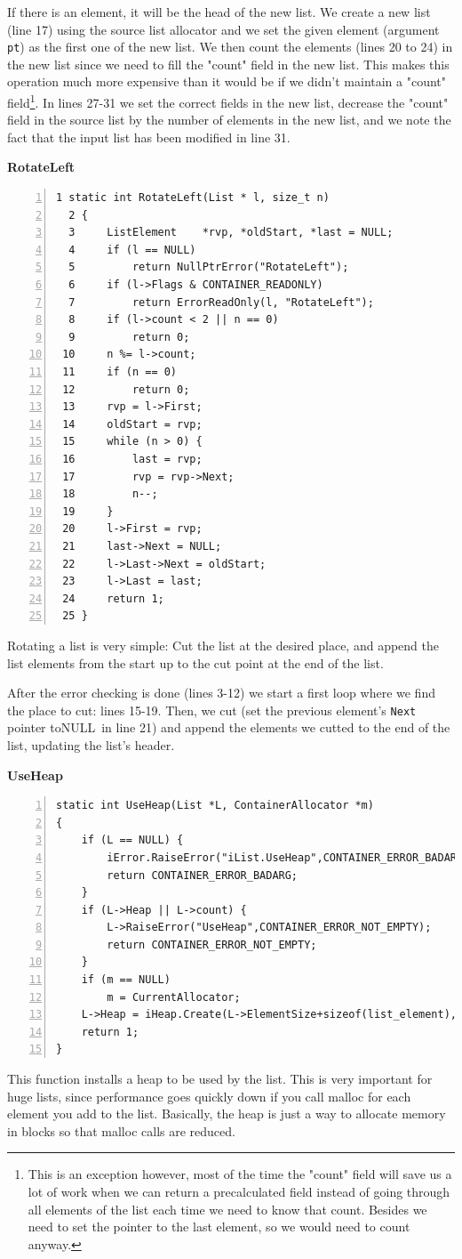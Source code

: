 \documentclass[12pt,a4paper]{memoir} %
\newif\iftth
\newcommand{\container}{}
\newcommand{\function}[1] {%
\vspace{0.2in}
\par\noindent
\textbf{#1}\index{#1!code for \container} \hrulefill
\iftth\else
\nopagebreak
\fi
\noindent\begin{Verbatim}[numbers=left, xleftmargin=7mm]}
\newcommand{\Null}{{\iftth \ NULL \else \footnotesize NULL\  \fi}}
\begin{document}
{{If there is an element, it will be the head of the new list. We create a new list (line 17) using the source list allocator
and we set the given element (argument \verb,pt,) as the first one of the new 
list. We then count the elements (lines 20 to 24) in the new list
since we need to fill the "count" field in the new list. This makes this operation much more expensive than it would be
if we didn't maintain a "count" field\footnote{This is an exception however, most of the time the "count" field will save us a lot of work when we can
return a precalculated field instead of going through all elements of the list each time we need to know that count. Besides we need to 
set the pointer to the last element, so we would need to count anyway.}.
In lines 27-31 we set the correct fields in the new list, decrease the "count" field in the source list by the number of elements in the new list,
and we note the fact that the input list has been modified in line 31.
\function{RotateLeft}
  1 static int RotateLeft(List * l, size_t n)
  2 {
  3     ListElement    *rvp, *oldStart, *last = NULL;
  4     if (l == NULL)
  5         return NullPtrError("RotateLeft");
  6     if (l->Flags & CONTAINER_READONLY)
  7         return ErrorReadOnly(l, "RotateLeft");
  8     if (l->count < 2 || n == 0)
  9         return 0;
 10     n %= l->count;
 11     if (n == 0)
 12         return 0;
 13     rvp = l->First;
 14     oldStart = rvp;
 15     while (n > 0) {
 16         last = rvp;
 17         rvp = rvp->Next;
 18         n--;
 19     }
 20     l->First = rvp;
 21     last->Next = NULL;
 22     l->Last->Next = oldStart;
 23     l->Last = last;
 24     return 1;
 25 }
\end{Verbatim}

Rotating a list is very simple: Cut the list at the desired place, and append the list elements from the start up to the cut point at the 
end of the list. 

After the error checking is done (lines 3-12) we start
a first loop where we find the place to cut: lines 15-19.
Then, we cut (set the previous element's \verb,Next, pointer to\Null in line 21) and append the
elements we cutted to the end of the list, updating the list's header.

\function{UseHeap}
static int UseHeap(List *L, ContainerAllocator *m)
{
    if (L == NULL) {
        iError.RaiseError("iList.UseHeap",CONTAINER_ERROR_BADARG);
        return CONTAINER_ERROR_BADARG;
    }
    if (L->Heap || L->count) {
        L->RaiseError("UseHeap",CONTAINER_ERROR_NOT_EMPTY);
        return CONTAINER_ERROR_NOT_EMPTY;
    }
    if (m == NULL)
        m = CurrentAllocator;
    L->Heap = iHeap.Create(L->ElementSize+sizeof(list_element), m);
    return 1;
}
\end{Verbatim}
This function installs a heap to be used by the list. This is very important for huge lists, since performance goes quickly down if you call malloc 
for each element you add to the list. Basically, the heap is just a way to allocate memory in blocks so that malloc calls are reduced.
}}
\end{document}
